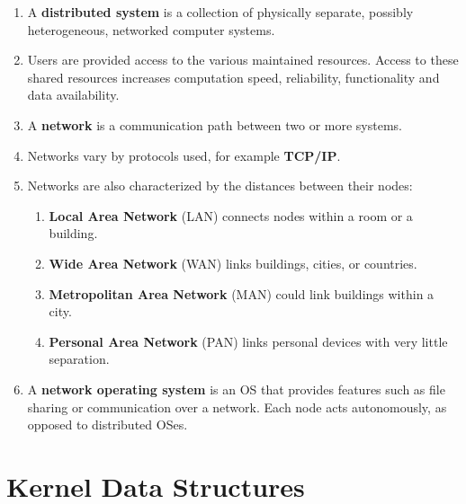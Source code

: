 \documentclass[journal,12pt,twocolumn]{IEEEtran}
\begin{document}
\begin{enumerate}
    \item A \textbf{distributed system} is a collection of physically
    separate, possibly heterogeneous, networked computer systems.
    \item Users are provided access to the various maintained resources. Access 
    to these shared resources increases computation speed, reliability, 
    functionality and data availability.
    \item A \textbf{network} is a communication path between two or more systems.
    \item Networks vary by protocols used, for example \textbf{TCP/IP}.
    \item Networks are also characterized by the distances between their nodes:
    \begin{enumerate}
        \item \textbf{Local Area Network} (LAN) connects nodes within a room or
        a building.
        \item \textbf{Wide Area Network} (WAN) links buildings, cities, or 
        countries.
        \item \textbf{Metropolitan Area Network} (MAN) could link buildings
        within a city.
        \item \textbf{Personal Area Network} (PAN) links personal devices with
        very little separation.
    \end{enumerate}
    \item A \textbf{network operating system} is an OS that provides features
    such as file sharing or communication over a network. Each node acts 
    autonomously, as opposed to distributed OSes.
\end{enumerate}

\section{Kernel Data Structures}
\end{document}
